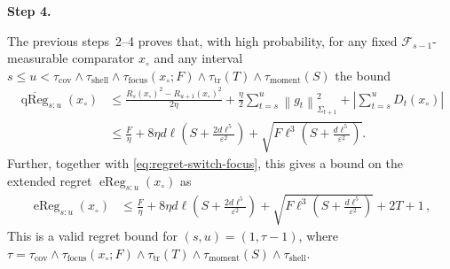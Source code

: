 \documentclass{article}
\newcommand{\proofstepinline}[1]{%
    {\normalfont\normalsize\bfseries\color{blue!55!black}Step #1.}\enspace
}
\newcommand{\F}{\mathcal F}
\newcommand{\1}{\mathbf 1}
\newcommand{\eps}{\varepsilon}
\newcommand{\normm}[2]{\left\lVert #1\right\rVert_{#2}}
\begin{document}
\newpage
\proofstepinline{4}
The previous steps~2--4 proves that, with high probability, for any fixed $\F_{s-1}$-measurable comparator $x_{\circ}$
and any interval $s\leq u< \tau_\mathrm{cov} \wedge \tau_{\mathrm{shell}} \wedge \tau_{\mathrm{focus}}(x_{\circ}; F) \wedge \tau_{\mathrm{tr}}(T) \wedge \tau_{\mathrm{moment}}(S)$ the bound
\begin{align}
    \overline{\operatorname{qReg}}_{s:u}(x_{\circ})
     & \leq
    \frac{R_s(x_{\circ})^2 - R_{u+1}(x_{\circ})^2}{2\eta }
    +\frac{\eta}{2}\sum_{t=s}^{u}\normm{g_t}{\Sigma_{t+1}}^2
    +\left|
    \sum_{t=s}^{u}
    D_t(x_{\circ})
    \right| \\
     & \leq
    \frac{F}{\eta }
    +8\eta d\ell\left(S+\frac{2d\ell^5}{\eps^2}\right)
    +\sqrt{F\ell^3\left(S+\frac{d\ell^5}{\eps^2}\right)}.
\end{align}
Further, together with \eqref{eq:regret-switch-focus}, this gives a bound on the extended regret $\operatorname{eReg}_{s:u}(x_{\circ})$ as
\begin{align}
    \operatorname{eReg}_{s:u}(x_{\circ})
     & \leq
    \frac{F}{\eta }
    +8\eta d\ell\left(S+\frac{2d\ell^5}{\eps^2}\right)
    +\sqrt{F\ell^3\left(S+\frac{d\ell^5}{\eps^2}\right)}
    +
    2T
    +1\,,
    \label{eq:regret-switch-focus-2}
\end{align}
This is a valid regret bound for $(s,u) = (1,\tau-1)$, where $\tau=\tau_{\mathrm{cov}} \wedge \tau_{\mathrm{focus}}(x_{\circ}; F) \wedge \tau_{\mathrm{tr}}(T) \wedge \tau_{\mathrm{moment}}(S) \wedge \tau_{\mathrm{shell}}$.
\end{document}
